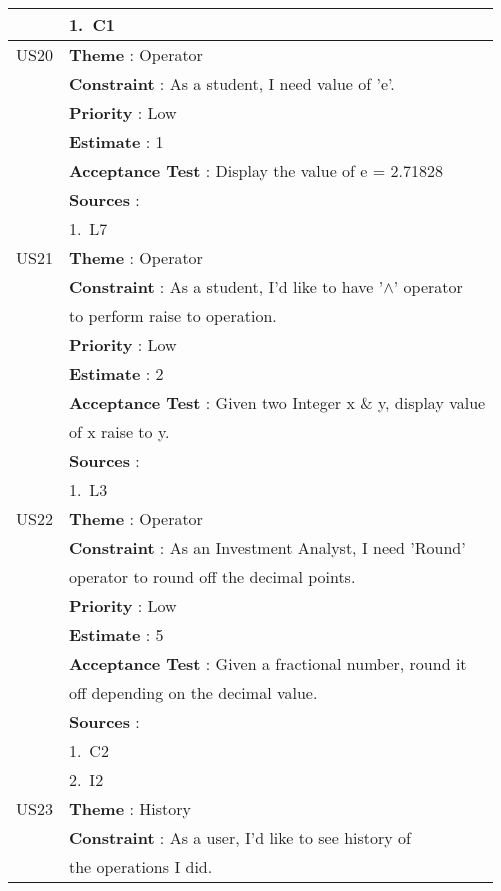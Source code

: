 \documentclass{article}
\begin{document}
\begin{longtable}{|| c || l ||}
         & 1.~C1 \\
         \hline
         US20 & \textbf{Theme} : Operator \\
         & \textbf{Constraint} : As a student, I need value of 'e'.\\
         & \textbf{Priority} : Low \\
         & \textbf{Estimate} : 1 \\
         & \textbf{Acceptance Test} : Display the value of e =  2.71828\\
         & \textbf{Sources} : \\
         & 1.~L7 \\
         \hline
         US21 & \textbf{Theme} : Operator \\
         & \textbf{Constraint} : As a student, I'd like to have '$\wedge$' operator\\
         & to perform raise to operation.\\
         & \textbf{Priority} : Low \\
         & \textbf{Estimate} : 2 \\
         & \textbf{Acceptance Test} : Given two Integer x \& y, display value\\
         & of x raise to y.\\
         & \textbf{Sources} : \\
         & 1.~L3 \\
         \hline
         \newpage
         \hline
         US22 & \textbf{Theme} : Operator \\
         & \textbf{Constraint} : As an Investment Analyst, I need 'Round' \\
         & operator to round off the decimal points.\\
         & \textbf{Priority} : Low \\
         & \textbf{Estimate} : 5 \\
         & \textbf{Acceptance Test} : Given a fractional number, round it \\
         & off depending on the decimal value.\\
         & \textbf{Sources} : \\
         & 1.~C2 \\
         & 2.~I2 \\
         \hline
         US23 & \textbf{Theme} : History \\
         & \textbf{Constraint} : As a user, I'd like to see history of \\
         & the operations I did.\\

\end{longtable}
\end{document}
